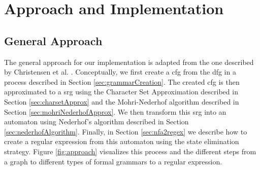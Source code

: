 \chapter{Approach and Implementation}
\label{chapter:Approach}


\section{General Approach}

The general approach for our implementation is adapted from the one described by Christensen et al. \cite{brics}. Conceptually, we first create a \acf{cfg} from the \ac{dfg} in a process described in Section \ref{sec:grammarCreation}.
The created \ac{cfg} is then approximated to a \acf{srg} using the Character Set Approximation described in Section \ref{sec:charsetApprox} and the Mohri-Nederhof algorithm described in Section \ref{sec:mohriNederhofApprox}. We then transform this \ac{srg} into an automaton using Nederhof's algorithm described in Section \ref{sec:nederhofAlgorithm}. Finally, in Section \ref{sec:nfa2regex} we describe how to create a regular expression from this automaton using the state elimination strategy. Figure \ref{fig:approach} visualizes this process and the different steps from a graph to different types of formal grammars to a regular expression.


